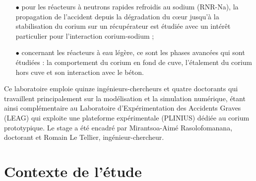 \begin{itemize}
	\item[$\bullet$] pour les réacteurs à neutrons rapides refroidis au sodium (RNR-Na), la propagation de l'accident depuis la dégradation du c\oe ur jusqu'à la stabilisation du corium sur un récupérateur est étudiée avec un intérêt particulier pour l'interaction corium-sodium ; 
	\item[$\bullet$] concernant les réacteurs à eau légère, ce sont les phases avancées qui sont étudiées : la comportement du corium en fond de cuve, l'étalement du corium hors cuve et son interaction avec le béton.
\end{itemize}
Ce laboratoire emploie quinze ingénieurs-chercheurs et quatre doctorants qui travaillent principalement sur la modélisation et la simulation numérique, étant ainsi complémentaire au Laboratoire d'Expérimentation des Accidents Graves (LEAG) qui exploite une plateforme expérimentale (PLINIUS) dédiée au corium prototypique. Le stage a été encadré par Mirantsoa-Aimé Rasolofomanana, doctorant et Romain Le Tellier, ingénieur-chercheur.

\section{Contexte de l'étude}
